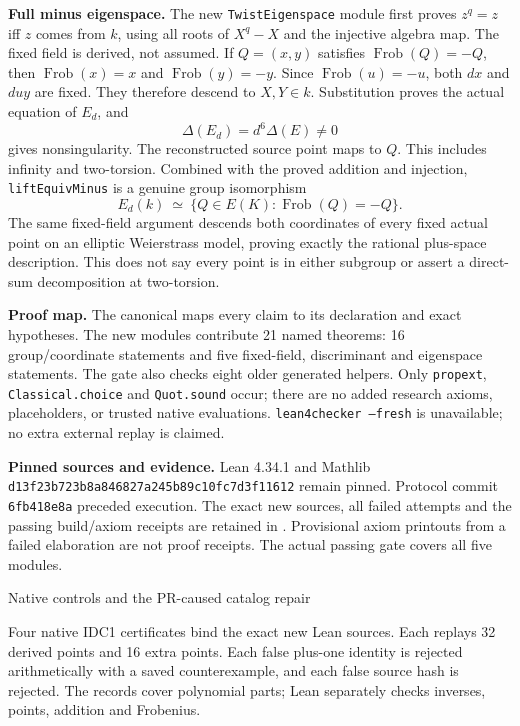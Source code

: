 \documentclass[10pt]{article}
\newcommand{\Frob}{\operatorname{Frob}}
\begin{document}
\textbf{Full minus eigenspace.} The new \texttt{TwistEigenspace} module first
proves $z^q=z$ iff $z$ comes from $k$, using all roots of $X^q-X$ and the
injective algebra map. The fixed field is derived, not assumed. If
$Q=(x,y)$ satisfies $\Frob(Q)=-Q$, then $\Frob(x)=x$ and $\Frob(y)=-y$.
Since $\Frob(u)=-u$, both $dx$ and $duy$ are fixed. They therefore descend
to $X,Y\in k$. Substitution proves the actual equation of $E_d$, and
\[
\Delta(E_d)=d^6\Delta(E)\ne0
\]
gives nonsingularity. The reconstructed source point maps to $Q$.
This includes infinity and two-torsion. Combined with the proved addition
and injection, \texttt{liftEquivMinus} is a genuine group isomorphism
\[
E_d(k)\ \simeq\ \{Q\in E(K):\Frob(Q)=-Q\}.
\]
The same fixed-field argument descends both coordinates of every fixed
actual point on an elliptic Weierstrass model, proving exactly the rational
plus-space description. This does not say every point is in either subgroup
or assert a direct-sum decomposition at two-torsion.

\textbf{Proof map.} The canonical  maps every claim to
its declaration and exact hypotheses. The new modules contribute 21 named
theorems: 16 group/coordinate statements and five fixed-field, discriminant
and eigenspace statements. The gate also checks eight older generated helpers.
Only \texttt{propext}, \texttt{Classical.choice} and \texttt{Quot.sound} occur;
there are no added research axioms, placeholders, or trusted native evaluations.
\texttt{lean4checker --fresh} is unavailable; no extra external replay is claimed.

\textbf{Pinned sources and evidence.} Lean 4.34.1 and Mathlib
\texttt{d13f23b723b8a846827a245b89c10fc7d3f11612} remain pinned.
Protocol commit \texttt{6fb418e8a} preceded execution. The exact new sources,
all failed attempts and the passing build/axiom receipts are retained in
. Provisional axiom printouts from a
failed elaboration are not proof receipts. The actual passing gate covers
all five modules.

\newpage
\begin{center}{\Large Native controls and the PR-caused catalog repair}\end{center}
Four native IDC1 certificates bind the exact new Lean sources. Each replays
32 derived points and 16 extra points. Each false plus-one identity is rejected
arithmetically with a saved counterexample, and each false source hash is rejected.
The records cover polynomial parts; Lean separately checks inverses, points,
addition and Frobenius.
\end{document}
